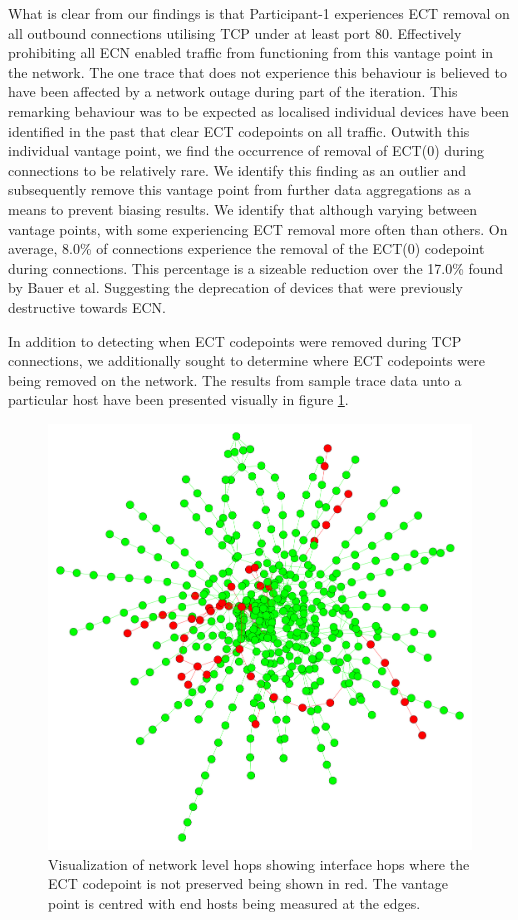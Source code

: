 \documentclass{l4proj}
\begin{document}
What is clear from our findings is that Participant-1 experiences ECT removal on all outbound connections utilising TCP under at least port 80. Effectively prohibiting all ECN enabled traffic from functioning from this vantage point in the network. The one trace that does not experience this behaviour is believed to have been affected by a network outage during part of the iteration. This remarking behaviour was to be expected as localised individual devices have been identified in the past that clear ECT codepoints on all traffic\cite{bauer_measuring_2011}. Outwith this individual vantage point, we find the occurrence of removal of ECT(0) during connections to be relatively rare. We identify this finding as an outlier and subsequently remove this vantage point from further data aggregations as a means to prevent biasing results. We identify that although varying between vantage points, with some experiencing ECT removal more often than others. On average, 8.0\% of connections experience the removal of the ECT(0) codepoint during connections. This percentage is a sizeable reduction over the 17.0\% found by Bauer et al\cite{bauer_measuring_2011}. Suggesting the deprecation of devices that were previously destructive towards ECN.

In addition to detecting when ECT codepoints were removed during TCP connections, we additionally sought to determine where ECT codepoints were being removed on the network. The results from sample trace data unto a particular host have been presented visually in figure \ref{fig:traces}.

\begin{figure}[H]
    \centering
    \includegraphics[scale=0.1]{dissertation/images/hops.pdf}
    \caption{Visualization of network level hops showing interface hops where the ECT codepoint is not preserved being shown in red. The vantage point is centred with end hosts being measured at the edges.}
    \label{fig:traces}
\end{figure}
\end{document}

